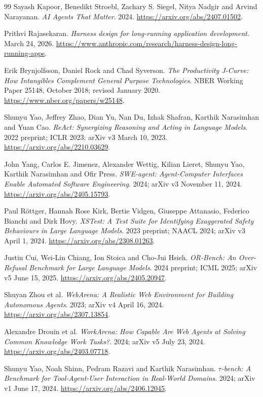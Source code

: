 \documentclass[11pt,letterpaper]{article}
\begin{document}
\clearpage
\begin{thebibliography}{99}
Sayash Kapoor, Benedikt Stroebl, Zachary S. Siegel, Nitya Nadgir and Arvind Narayanan. \emph{AI Agents That Matter}.
2024.
\url{https://arxiv.org/abs/2407.01502}.

Prithvi Rajasekaran. \emph{Harness design for long-running application development}.
March 24, 2026.
\url{https://www.anthropic.com/research/harness-design-long-running-apps}.

Erik Brynjolfsson, Daniel Rock and Chad Syverson. \emph{The Productivity J-Curve: How Intangibles Complement General Purpose Technologies}.
NBER Working Paper 25148, October 2018; revised January 2020.
\url{https://www.nber.org/papers/w25148}.

Shunyu Yao, Jeffrey Zhao, Dian Yu, Nan Du, Izhak Shafran, Karthik Narasimhan and Yuan Cao. \emph{ReAct: Synergizing Reasoning and Acting in Language Models}.
2022 preprint; ICLR 2023; arXiv v3 March 10, 2023.
\url{https://arxiv.org/abs/2210.03629}.

John Yang, Carlos E. Jimenez, Alexander Wettig, Kilian Lieret, Shunyu Yao, Karthik Narasimhan and Ofir Press. \emph{SWE-agent: Agent-Computer Interfaces Enable Automated Software Engineering}.
2024; arXiv v3 November 11, 2024.
\url{https://arxiv.org/abs/2405.15793}.

Paul R\"ottger, Hannah Rose Kirk, Bertie Vidgen, Giuseppe Attanasio, Federico Bianchi and Dirk Hovy. \emph{XSTest: A Test Suite for Identifying Exaggerated Safety Behaviours in Large Language Models}.
2023 preprint; NAACL 2024; arXiv v3 April 1, 2024.
\url{https://arxiv.org/abs/2308.01263}.

Justin Cui, Wei-Lin Chiang, Ion Stoica and Cho-Jui Hsieh. \emph{OR-Bench: An Over-Refusal Benchmark for Large Language Models}.
2024 preprint; ICML 2025; arXiv v5 June 15, 2025.
\url{https://arxiv.org/abs/2405.20947}.

Shuyan Zhou et al. \emph{WebArena: A Realistic Web Environment for Building Autonomous Agents}.
2023; arXiv v4 April 16, 2024.
\url{https://arxiv.org/abs/2307.13854}.

Alexandre Drouin et al. \emph{WorkArena: How Capable Are Web Agents at Solving Common Knowledge Work Tasks?}.
2024; arXiv v5 July 23, 2024.
\url{https://arxiv.org/abs/2403.07718}.

Shunyu Yao, Noah Shinn, Pedram Razavi and Karthik Narasimhan. \emph{$\tau$-bench: A Benchmark for Tool-Agent-User Interaction in Real-World Domains}.
2024; arXiv v1 June 17, 2024.
\url{https://arxiv.org/abs/2406.12045}.


\end{thebibliography}
\end{document}
